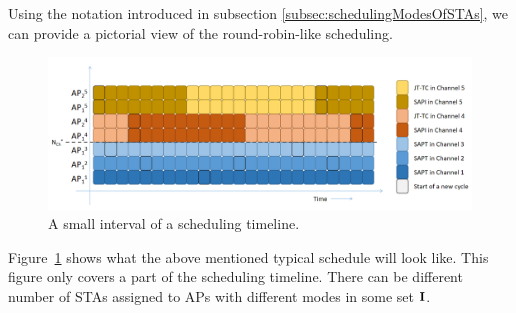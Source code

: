 Using the notation introduced in subsection \ref{subsec:schedulingModesOfSTAs}, we can provide a pictorial view of the round-robin-like scheduling.


\begin{figure}[h]
    \begin{center}
        \includegraphics[width=6.5in]{Scheduling.png}
        \caption{A small interval of a scheduling timeline.}
        \label{fig:Scheduling}
    \end{center}
\end{figure}



Figure~\ref{fig:Scheduling} shows what the above mentioned typical schedule will look like.
This figure only covers a part of the scheduling timeline. There can be different number of STAs assigned to APs with different modes in some set $\textbf{I}$.






